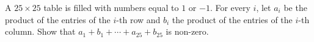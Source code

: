 A $25 \times 25$ table is filled with numbers equal to $1$ or $-1$. For every $i$, let $a_i$ be the product of the entries of the $i$-th row and $b_i$ the product of the entries of the $i$-th column. Show that $a_1 + b_1 + \cdots + a_{25} + b_{25}$ is non-zero.
